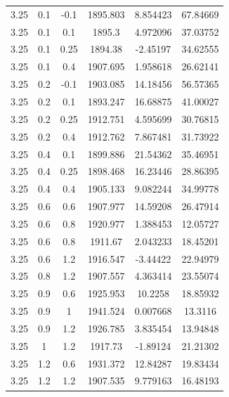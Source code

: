 \begin{longtable}{|c|c|c|c|c|c|}
	3.25  & 0.1   & -0.1  & 1895.803 & 8.854423 & 67.84669 \\
	3.25  & 0.1   & 0.1   & 1895.3 & 4.972096 & 37.03752 \\
	3.25  & 0.1   & 0.25  & 1894.38 & -2.45197 & 34.62555 \\
	3.25  & 0.1   & 0.4   & 1907.695 & 1.958618 & 26.62141 \\
	3.25  & 0.2   & -0.1  & 1903.085 & 14.18456 & 56.57365 \\
	3.25  & 0.2   & 0.1   & 1893.247 & 16.68875 & 41.00027 \\
	3.25  & 0.2   & 0.25  & 1912.751 & 4.595699 & 30.76815 \\
	3.25  & 0.2   & 0.4   & 1912.762 & 7.867481 & 31.73922 \\
	3.25  & 0.4   & 0.1   & 1899.886 & 21.54362 & 35.46951 \\
	3.25  & 0.4   & 0.25  & 1898.468 & 16.23446 & 28.86395 \\
	3.25  & 0.4   & 0.4   & 1905.133 & 9.082244 & 34.99778 \\
	3.25  & 0.6   & 0.6   & 1907.977 & 14.59208 & 26.47914 \\
	3.25  & 0.6   & 0.8   & 1920.977 & 1.388453 & 12.05727 \\
	3.25  & 0.6   & 0.8   & 1911.67 & 2.043233 & 18.45201 \\
	3.25  & 0.6   & 1.2   & 1916.547 & -3.44422 & 22.94979 \\
	3.25  & 0.8   & 1.2   & 1907.557 & 4.363414 & 23.55074 \\
	3.25  & 0.9   & 0.6   & 1925.953 & 10.2258 & 18.85932 \\
	3.25  & 0.9   & 1     & 1941.524 & 0.007668 & 13.3116 \\
	3.25  & 0.9   & 1.2   & 1926.785 & 3.835454 & 13.94848 \\
	3.25  & 1     & 1.2   & 1917.73 & -1.89124 & 21.21302 \\
	3.25  & 1.2   & 0.6   & 1931.372 & 12.84287 & 19.83434 \\
	3.25  & 1.2   & 1.2   & 1907.535 & 9.779163 & 16.48193 
	\label{tab4.3}
\end{longtable}%

